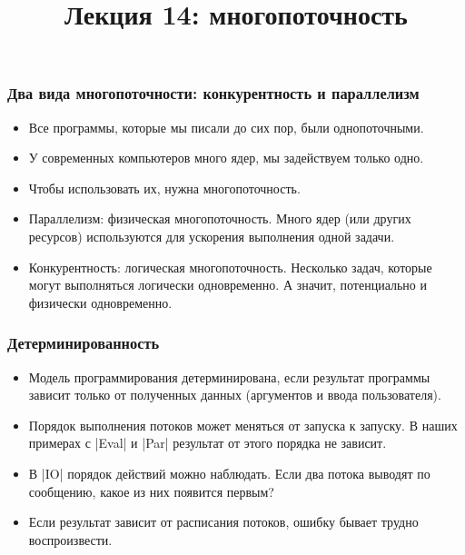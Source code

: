 \documentclass[11pt]{beamer}
\title{Лекция 14: многопоточность}
\begin{document}
\begin{frame}[plain]
  \maketitle
\end{frame}

\begin{frame}[fragile]
  \frametitle{Два вида многопоточности: конкурентность и параллелизм}
  \begin{itemize}
    \item Все программы, которые мы писали до сих пор, были однопоточными.
    \item У современных компьютеров много ядер, мы задействуем только одно.
    \item Чтобы использовать их, нужна многопоточность. \pause
    \item Параллелизм: физическая многопоточность. Много ядер (или других ресурсов) используются для ускорения выполнения одной задачи. \pause
    \item Конкурентность: логическая многопоточность. Несколько задач, которые могут выполняться логически одновременно. А значит, потенциально и физически одновременно.
  \end{itemize}
\end{frame}

\begin{frame}[fragile]
  \frametitle{Детерминированность}
  \begin{itemize}
    \item Модель программирования детерминирована, если результат программы зависит только от полученных данных (аргументов и ввода пользователя). \pause
    \item Порядок выполнения потоков может меняться от запуска к запуску. В наших примерах с \haskinline|Eval| и \haskinline|Par| результат от этого порядка не зависит. \pause
    \item В \haskinline|IO| порядок действий можно наблюдать. Если два потока выводят по сообщению, какое из них появится первым?
    \item Если результат зависит от расписания потоков, ошибку бывает трудно воспроизвести.
  \end{itemize}
\end{frame}
\end{document}
